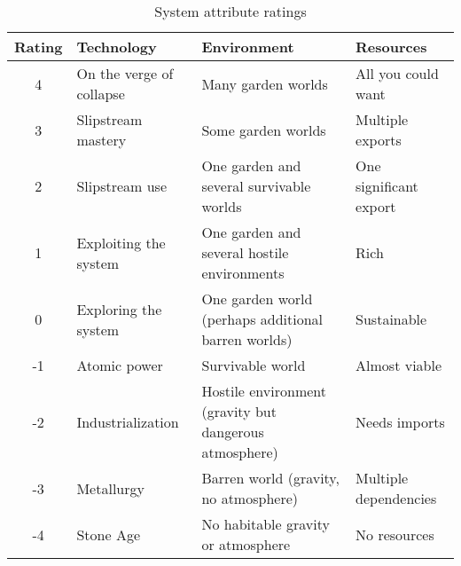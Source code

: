 
\begin{table*}[ht]
\centering
\begin{tabular}{clll}
\toprule
Rating & Technology & Environment & Resources \\
\midrule
4 & On the verge of collapse
& Many garden worlds
& All you could want \\
3 & Slipstream mastery
& Some garden worlds
& Multiple exports \\
2 & Slipstream use
& One garden and several survivable worlds
& One significant export \\
1 & Exploiting the system
& One garden and several hostile environments
& Rich \\
0 & Exploring the system
& One garden world (perhaps additional barren worlds)
& Sustainable \\
-1 & Atomic power
& Survivable world
& Almost viable \\
-2 & Industrialization
& Hostile environment (gravity but dangerous atmosphere)
& Needs imports \\
-3 & Metallurgy
& Barren world (gravity, no atmosphere)
& Multiple dependencies \\
-4 & Stone Age
& No habitable gravity or atmosphere
& No resources \\
\bottomrule
\end{tabular}
\caption{System attribute ratings}
\label{tab:system-attribute-ratings}
\end{table*}
